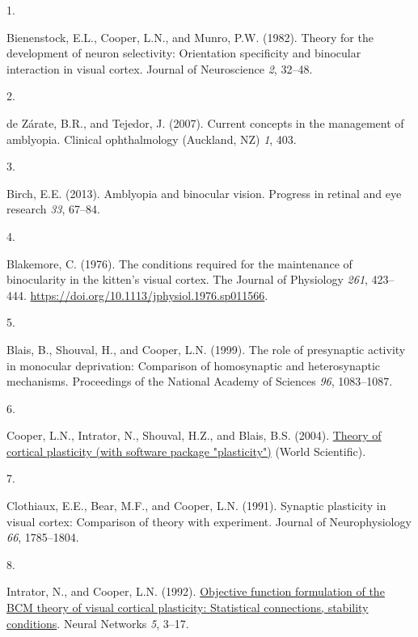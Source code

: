 \documentclass[
]{article}
\newlength{\cslhangindent}
\newlength{\csllabelwidth}
\newenvironment{CSLReferences}[2] %
 {\begin{list}{}{%
  \setlength{\itemindent}{0pt}
  \setlength{\leftmargin}{0pt}
  \setlength{\parsep}{0pt}
  \ifodd #1
   \setlength{\leftmargin}{\cslhangindent}
   \setlength{\itemindent}{-1\cslhangindent}
  \fi
  \setlength{\itemsep}{#2\baselineskip}}}
 {\end{list}}
\newcommand{\CSLLeftMargin}[1]{\parbox[t]{\csllabelwidth}{\strut#1\strut}}
\newcommand{\CSLRightInline}[1]{\parbox[t]{\linewidth - \csllabelwidth}{\strut#1\strut}}
\begin{document}
\protect{}\label{refs}
\begin{CSLReferences}{0}{1}
\CSLLeftMargin{1. }%
\CSLRightInline{Bienenstock, E.L., Cooper, L.N., and Munro, P.W. (1982).
Theory for the development of neuron selectivity: Orientation
specificity and binocular interaction in visual cortex. Journal of
Neuroscience \emph{2}, 32--48.}

\CSLLeftMargin{2. }%
\CSLRightInline{de Zárate, B.R., and Tejedor, J. (2007). Current
concepts in the management of amblyopia. Clinical ophthalmology
(Auckland, NZ) \emph{1}, 403.}

\CSLLeftMargin{3. }%
\CSLRightInline{Birch, E.E. (2013). Amblyopia and binocular vision.
Progress in retinal and eye research \emph{33}, 67--84.}

\CSLLeftMargin{4. }%
\CSLRightInline{Blakemore, C. (1976). The conditions required for the
maintenance of binocularity in the kitten's visual cortex. The Journal
of Physiology \emph{261}, 423--444.
\url{https://doi.org/10.1113/jphysiol.1976.sp011566}.}

\CSLLeftMargin{5. }%
\CSLRightInline{Blais, B., Shouval, H., and Cooper, L.N. (1999). The
role of presynaptic activity in monocular deprivation: {Comparison} of
homosynaptic and heterosynaptic mechanisms. Proceedings of the National
Academy of Sciences \emph{96}, 1083--1087.}

\CSLLeftMargin{6. }%
\CSLRightInline{Cooper, L.N., Intrator, N., Shouval, H.Z., and Blais,
B.S. (2004).
\href{https://books.google.com/books?hl=en&lr=&id=xQvJCgAAQBAJ&oi=fnd&pg=PR3&dq=theory+of+cortical+plasticity&ots=xBvN2tCKav&sig=XNL6fAMSzJ0rYN5QBkEOUmcohVo}{Theory
of cortical plasticity (with software package "plasticity")} (World
Scientific).}

\CSLLeftMargin{7. }%
\CSLRightInline{Clothiaux, E.E., Bear, M.F., and Cooper, L.N. (1991).
Synaptic plasticity in visual cortex: Comparison of theory with
experiment. Journal of Neurophysiology \emph{66}, 1785--1804.}

\CSLLeftMargin{8. }%
\CSLRightInline{Intrator, N., and Cooper, L.N. (1992).
\href{ftp://cns.brown.edu/nin/papers/cooper.ps.Z}{Objective function
formulation of the {BCM} theory of visual cortical plasticity:
{Statistical} connections, stability conditions}. Neural Networks
\emph{5}, 3--17.}


\end{CSLReferences}
\end{document}
